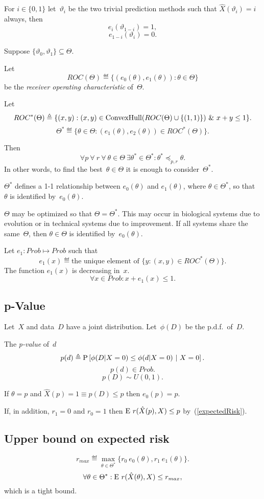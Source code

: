 \documentclass[10pt,a4paper]{article}
\theoremstyle{plain} \newtheorem{Lem}{Lemma}
\begin{document}
For $i \in \{0,1\}$ let~$\vartheta_i$ be the two trivial prediction methods such that $\hat X(\vartheta_i) = i$ always,
then
$$ e_i(\vartheta_{1-i}) = 1, $$
$$ e_{1-i}(\vartheta_i) = 0. $$

Suppose $\{\vartheta_0, \vartheta_1\} \subseteq \Theta$.

Let
$$ROC(\Theta) \eqdef \{(e_0(\theta), e_1(\theta)) : \theta \in \Theta\}$$
be the {\em receiver operating characteristic} of~$\Theta$.

Let
$$ ROC^*(\Theta) \triangleq \{(x, y) : (x,y) \in \mathrm {ConvexHull}(ROC(\Theta) \cup \{(1,1)\}) \ \& \  x + y \le 1 \}. $$
$$ \Theta^* \eqdef \{\theta \in \Theta : (e_1(\theta),e_2(\theta)) \in ROC^*(\Theta)\}.
$$

Then
$$ \forall p \ \forall \ r \ \forall \ \theta \in \Theta \ \exists \theta^* \in \Theta^* : \theta^* \preceq_{p,r} \theta. $$
In other words, to find the best~$\theta \in \Theta$ it is enough to consider~$\Theta^*$.

$\Theta^*$ defines a 1-1 relationship between $e_0(\theta)$ and $e_1(\theta)$, where $\theta \in \Theta^*$,
so that~$\theta$ is identified by~$e_0(\theta)$.

$\Theta$ may be optimized so that $\Theta = \Theta^*$.
This may occur in biological systems due to evolution or in technical systems due to improvement.
If all systems share the same~$\Theta$, then $\theta \in \Theta$ is identified by~$e_0(\theta)$.

Let $e_1: Prob \mapsto Prob$ such that
$$ e_1(x) \eqdef \text{the unique element of } \{ y : (x,y) \in ROC^*(\Theta) \}. $$
The function $e_1(x)$ is decreasing in~$x$.
$$ \forall x \in Prob : x + e_1(x) \le 1. $$


\subsection {p-Value}
Let~$X$ and data~$D$ have a joint distribution.
Let~$\phi(D)$ be the p.d.f.~of~$D$.

The {\em p-value} of~$d$
$$ p(d) \triangleq \mathrm P\left[\phi(D|X=0) \le \phi(d|X=0) \ | \ X=0 \right]. $$
$$ p(d) \in Prob. $$
$$ p(D) \sim U(0,1). $$

If $\theta = p$ and $\hat X(p) = 1 \equiv p(D) \le p$ then $e_0(p) = p$.

If, in addition, $r_1=0$ and $r_0=1$ then $\mathrm E \  r(\hat X(p), X) \le p$ by~(\ref{expectedRisk}).


\subsection {Upper bound on expected risk}
$$ r_{max} \eqdef \max_{\theta \in \Theta^*} \{r_0 \ e_0(\theta), r_1 \ e_1(\theta) \}. $$
$$ \forall \theta \in \Theta^* : \mathrm E \  r(\hat X(\theta), X) \le r_{max}, $$
which is a tight bound.
\end{document}
